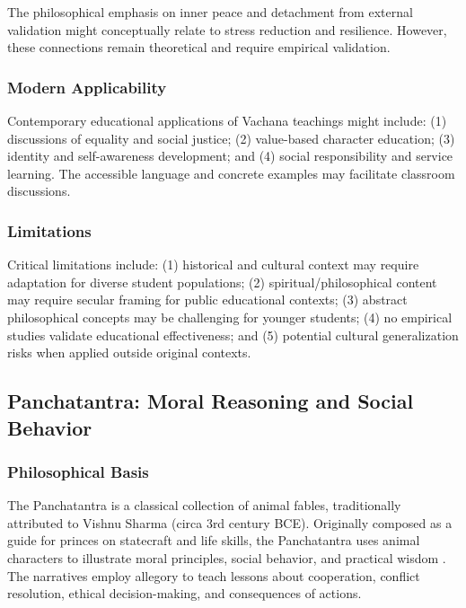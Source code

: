 \documentclass[12pt,a4paper,twocolumn]{article}
\begin{document}
The philosophical emphasis on inner peace and detachment from external validation might conceptually relate to stress reduction and resilience. However, these connections remain theoretical and require empirical validation.

\subsubsection{Modern Applicability}

Contemporary educational applications of Vachana teachings might include: (1) discussions of equality and social justice; (2) value-based character education; (3) identity and self-awareness development; and (4) social responsibility and service learning. The accessible language and concrete examples may facilitate classroom discussions.

\subsubsection{Limitations}

Critical limitations include: (1) historical and cultural context may require adaptation for diverse student populations; (2) spiritual/philosophical content may require secular framing for public educational contexts; (3) abstract philosophical concepts may be challenging for younger students; (4) no empirical studies validate educational effectiveness; and (5) potential cultural generalization risks when applied outside original contexts.

\subsection{Panchatantra: Moral Reasoning and Social Behavior}

\subsubsection{Philosophical Basis}

The Panchatantra is a classical collection of animal fables, traditionally attributed to Vishnu Sharma (circa 3rd century BCE). Originally composed as a guide for princes on statecraft and life skills, the Panchatantra uses animal characters to illustrate moral principles, social behavior, and practical wisdom \citep{Mitra2015}. The narratives employ allegory to teach lessons about cooperation, conflict resolution, ethical decision-making, and consequences of actions.
\end{document}
